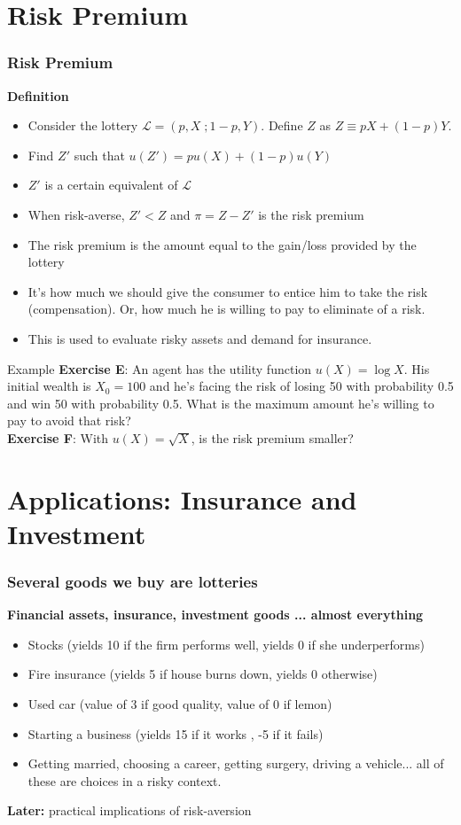 \documentclass[handout]{beamer}
\newenvironment{iPar}[1]{\textbf{#1} \begin{itemize}}{\end{itemize}}
\newcommand{\mdp}{\medskip \pause}
\newcommand{\mc}{\mathcal}
\begin{document}
\section{Risk Premium}

\begin{frame}\frametitle{Risk Premium}

\begin{iPar}{Definition} \item Consider the lottery $\mc L =
(p,X\;;1-p,Y)$. Define $Z$ as $Z \equiv pX+ (1-p)Y$. \item Find $Z'$ such that $u(Z') = pu(X) + (1-p)u(Y)$ \item $Z'$ is a certain equivalent of $\mc L$ \item When risk-averse, $Z' < Z$ and $
\pi = Z-Z'$ is the risk premium \item The risk premium is the amount equal to the gain/loss provided by the lottery \item It's how much we should give the consumer to entice him to take the risk (compensation). Or, how much he is willing to pay to eliminate of a risk. 
\item This is used to evaluate risky assets and demand for insurance. 
\end{iPar}

\end{frame}

\begin{frame}{Example}
\textbf{Exercise E}: An agent has the utility function $u(X)=\log X$. His initial wealth is $X_0 = 100$ and he's facing the risk of losing 50 with probability 0.5 and win 50 with probability 0.5. What is the maximum amount he's willing to pay to avoid that risk? \\
\textbf{Exercise F}: With $u(X) = \sqrt X $, is the risk premium smaller?
\end{frame}


\section{Applications: Insurance and Investment}

\begin{frame}\frametitle{Several goods we buy are lotteries}
\begin{iPar}{Financial assets, insurance, investment goods ...
almost everything} \item Stocks (yields 10 if the firm performs well, yields 0 if she underperforms) \item Fire insurance (yields 5 if house burns down, yields 0 otherwise) \item Used car (value of 3 if good quality, value of 0 if lemon) \item
Starting a business (yields 15 if it works , -5 if it fails) \item Getting married, choosing a career, getting surgery, driving a vehicle... all of these are choices in a risky context. \end{iPar} \mdp \textbf{Later:} practical implications of risk-aversion \end{frame}
\end{document}
